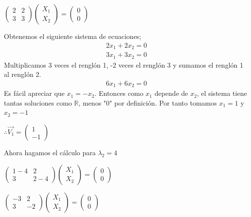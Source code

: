\documentclass[letterpaper]{article}
\renewcommand{\*}{\cdot}
\theoremstyle{definition}
\begin{document}
	\begin{center}
	$\begin{pmatrix} 2 & 2 \\ 3 & 3 \end{pmatrix} \begin{pmatrix}	X_{1} \\ X_{2} \end{pmatrix}= \begin{pmatrix}	0 \\ 0	\end{pmatrix}$
	\end{center}
	Obtenemos el siguiente sistema de ecuaciones;
	\begin{align*}
	2x_{1}+2x_{2}= 0\\
	3x_{1}+3x_{2}=0
	\end{align*}
	Multiplicamos 3 veces el renglón 1, -2 veces el renglón 3 y sumamos el renglón 1 al renglón 2.
	\begin{align*}
	6x_{1}+6x_{2}= 0
	\end{align*}
	Es fácil apreciar que $x_{1}=-x_{2}$. Entonces como $x_{1}$ depende de $x_{2}$, el sistema tiene tantas soluciones como $\mathbb{R}$, menos "0"  por definición. Por tanto tomamos $x_{1}= 1$ y $x_{2}=-1$
	\begin{center}
		$\therefore \vec{V_{1}} = \begin{pmatrix}	1 \\ -1	\end{pmatrix}$
	\end{center}
	Ahora hagamos el cálculo para $\lambda_{2}=4$\\
	\begin{center}
		$\begin{pmatrix} 1-4 & 2 \\ 3 & 2-4 \end{pmatrix} \begin{pmatrix}	X_{1} \\ X_{2} \end{pmatrix}= \begin{pmatrix}	0 \\ 0	\end{pmatrix}$
	\end{center} 
	\begin{center}
		$\begin{pmatrix} -3 & 2 \\ 3 & -2 \end{pmatrix} \begin{pmatrix}	X_{1} \\ X_{2} \end{pmatrix}= \begin{pmatrix}	0 \\ 0	\end{pmatrix}$
	\end{center}
\end{document}

